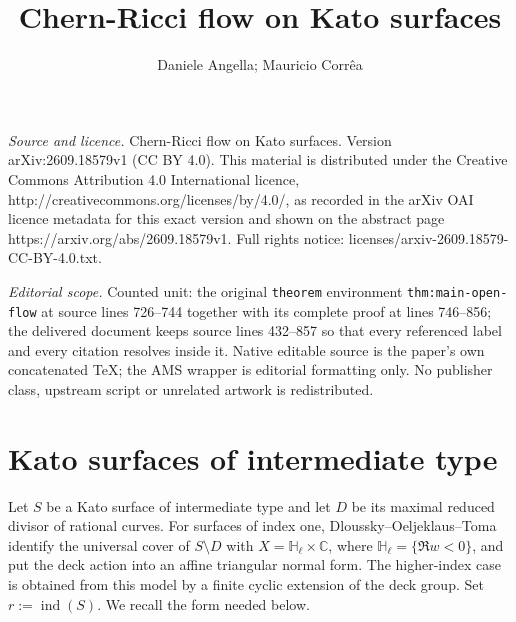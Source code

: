 \documentclass[10pt,a4paper]{amsart}
\numberwithin{equation}{section}
\begin{document}
\title[Chern-Ricci flow on Kato surfaces]{Chern-Ricci flow on Kato surfaces}
\author{Daniele Angella; Mauricio Corrêa}
\date{}
\maketitle
\noindent\emph{Source and licence.} Chern-Ricci flow on Kato surfaces. Version arXiv:2609.18579v1 (CC BY 4.0). This material is distributed under the Creative Commons Attribution 4.0 International licence, http://creativecommons.org/licenses/by/4.0/, as recorded in the arXiv OAI licence metadata for this exact version and shown on the abstract page https://arxiv.org/abs/2609.18579v1. Full rights notice: licenses/arxiv-2609.18579-CC-BY-4.0.txt.\par\smallskip
\noindent\textit{Editorial scope.} Counted unit: the original \texttt{theorem} environment \texttt{thm:main-open-flow} at source lines 726--744 together with its complete proof at lines 746--856; the delivered document keeps source lines 432--857 so that every referenced label and every citation resolves inside it. Native editable source is the paper's own concatenated TeX; the AMS wrapper is editorial formatting only. No publisher class, upstream script or unrelated artwork is redistributed.
\section{Kato surfaces of intermediate type}

Let $S$ be a Kato surface of intermediate type and let $D$ be its maximal reduced divisor of rational curves. For surfaces of index one, Dloussky--Oeljeklaus--Toma \cite{dloussky-oeljeklaus-toma} identify the universal cover of $S\setminus D$ with $X=\mathbb H_\ell\times\mathbb C$, where $\mathbb H_\ell=\{\Re w<0\}$, and put the deck action into an affine triangular normal form. The higher-index case is obtained from this model by a finite cyclic extension of the deck group. Set $r:=\operatorname{ind}(S)$. We recall the form needed below.

 
\end{document}
